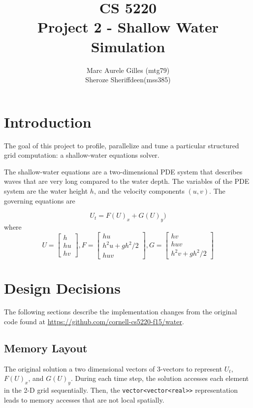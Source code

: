 \documentclass[11pt]{article}
\begin{document}
\title{CS 5220\\ Project 2 - Shallow Water Simulation}
\author{Marc Aurele Gilles (mtg79)\\ Sheroze Sheriffdeen(mss385)}
\maketitle

\section{Introduction}

The goal of this project to profile, parallelize and tune a particular structured grid computation: a shallow-water equations solver. 

The shallow-water equations are a two-dimensional PDE system that describes waves that are very long compared to the water depth. The variables of the PDE system are the water height $h$, and the velocity components $(u,v)$. The governing equations are

$$U_t = F(U)_x + G(U)_y)$$
where 
$$U = \begin{bmatrix}
h \\
hu \\
hv
\end{bmatrix}
,
F = \begin{bmatrix}
hu \\
h^2u+gh^2/2 \\
huv
\end{bmatrix}
,
G=
\begin{bmatrix}
hv \\
huv \\
h^2v+gh^2/2
\end{bmatrix}
$$


\section{Design Decisions}

The following sections describe the implementation changes from the original code found at \url{https://github.com/cornell-cs5220-f15/water}.

\subsection{Memory Layout}
The original solution a two dimensional vectors of 3-vectors to represent $U_t$, $F(U)_x$, and $G(U)_y$. During each time step, the solution accesses each element in the 2-D grid sequentially. Then, the \texttt{vector<vector<real>>} representation leads to memory accesses that are not local spatially. \\
\end{document}
